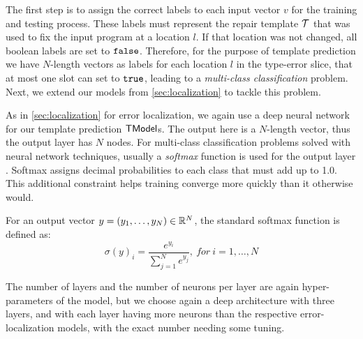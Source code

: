 The first step is to assign the correct labels to each input vector $v$ for the
training and testing process. These labels must represent the repair template
$\mathcal{T}$ that was used to fix the input program at a location $l$. If that location
was not changed, all boolean labels are set to $\mathtt{false}$. Therefore, for the
purpose of template prediction we have $N$-length vectors as labels for each
location $l$ in the type-error slice, that at most one slot can set to $\mathtt{true}$,
leading to a \emph{multi-class classification} problem. Next, we extend our
models from \autoref{sec:localization} to tackle this problem.

As in \autoref{sec:localization} for error localization, we again use a deep
neural network for our template prediction $\mathsf{TModel}$s. The output here is a
$N$-length vector, thus the output layer has $N$ nodes. For multi-class
classification problems solved with neural network techniques, usually a
\emph{softmax} function is used for the output layer
\citep[][]{Goodfellow-et-al-2016, Bishop-book-2006}. Softmax assigns decimal
probabilities to each class that must add up to 1.0. This additional constraint
helps training converge more quickly than it otherwise would.

For an output vector $y = (y_1, \dots, y_N) \in \mathbb{R}^{N}$, the standard softmax
function is defined as:
\[ \sigma(y)_i = \frac{e^{y_i}}{\sum_{j=1}^{N} e^{y_j}},\ for\ i = 1, \dots, N \]

The number of layers and the number of neurons per layer are again
hyper-parameters of the model, but we choose again a deep architecture with
three layers, and with each layer having more neurons than the respective
error-localization models, with the exact number needing some tuning.

